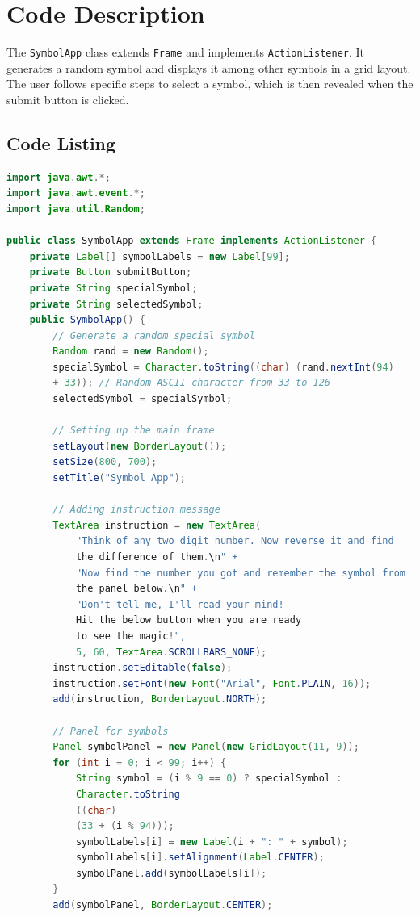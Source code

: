 \documentclass[12pt, a4paper]{article}
\begin{document}
\section*{Code Description}
The \texttt{SymbolApp} class extends \texttt{Frame} and implements \texttt{ActionListener}. It generates a random symbol and displays it among other symbols in a grid layout. The user follows specific steps to select a symbol, which is then revealed when the submit button is clicked.

\subsection{Code Listing}
\begin{lstlisting}[language=Java, caption=Java Swing Application Code]
import java.awt.*;
import java.awt.event.*;
import java.util.Random;

public class SymbolApp extends Frame implements ActionListener {
    private Label[] symbolLabels = new Label[99];
    private Button submitButton;
    private String specialSymbol;
    private String selectedSymbol;
    public SymbolApp() {
        // Generate a random special symbol
        Random rand = new Random();
        specialSymbol = Character.toString((char) (rand.nextInt(94)
        + 33)); // Random ASCII character from 33 to 126
        selectedSymbol = specialSymbol;

        // Setting up the main frame
        setLayout(new BorderLayout());
        setSize(800, 700);
        setTitle("Symbol App");

        // Adding instruction message
        TextArea instruction = new TextArea(
            "Think of any two digit number. Now reverse it and find
            the difference of them.\n" +
            "Now find the number you got and remember the symbol from
            the panel below.\n" +
            "Don't tell me, I'll read your mind!
            Hit the below button when you are ready
            to see the magic!",
            5, 60, TextArea.SCROLLBARS_NONE);
        instruction.setEditable(false);
        instruction.setFont(new Font("Arial", Font.PLAIN, 16));
        add(instruction, BorderLayout.NORTH);

        // Panel for symbols
        Panel symbolPanel = new Panel(new GridLayout(11, 9));
        for (int i = 0; i < 99; i++) {
            String symbol = (i % 9 == 0) ? specialSymbol : 
            Character.toString
            ((char) 
            (33 + (i % 94)));
            symbolLabels[i] = new Label(i + ": " + symbol);
            symbolLabels[i].setAlignment(Label.CENTER);
            symbolPanel.add(symbolLabels[i]);
        }
        add(symbolPanel, BorderLayout.CENTER);


\end{lstlisting}
\end{document}

